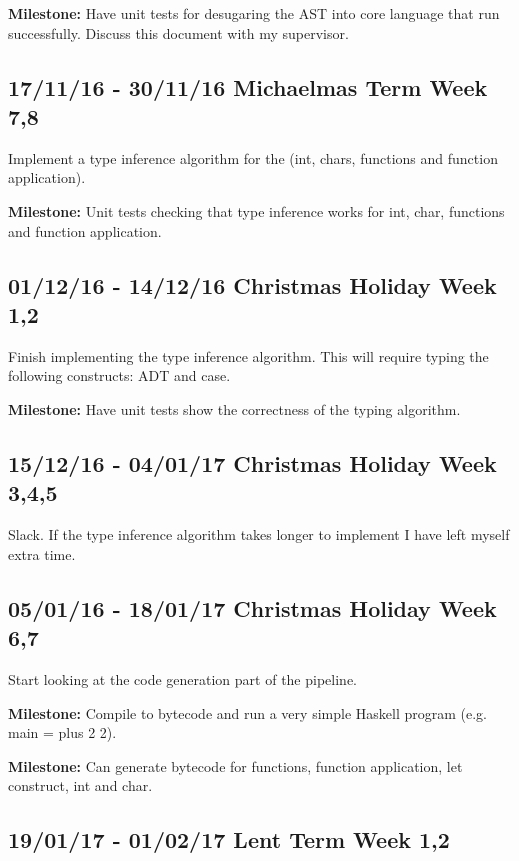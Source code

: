 \documentclass[a4paper]{article}
\begin{document}
      \textbf{Milestone:} Have unit tests for desugaring the AST into core language that run successfully. 
      Discuss this document with my supervisor.


    \subsection*{17/11/16 - 30/11/16 \hfill Michaelmas Term  Week 7,8}

      Implement a type inference algorithm for the (int, chars, functions and function application).

      \textbf{Milestone:} Unit tests checking that type inference works for int, char, functions and function application.

    \subsection*{01/12/16 - 14/12/16 \hfill Christmas Holiday Week 1,2}

    Finish implementing the type inference algorithm. This will require typing the following constructs: ADT and case.
    
    \textbf{Milestone:} Have unit tests show the correctness of the typing algorithm. 

    \subsection*{15/12/16 - 04/01/17 \hfill Christmas Holiday Week  3,4,5}

    Slack. If the type inference algorithm takes longer to implement I have left myself extra time.

    \subsection*{05/01/16 - 18/01/17 \hfill Christmas Holiday Week 6,7}

    Start looking at the code generation part of the pipeline.

    \textbf{Milestone:} Compile to bytecode and run a very simple Haskell program (e.g. main = plus 2 2).

    \textbf{Milestone:} Can generate bytecode for functions, function application, let construct, int and char.

    \subsection*{19/01/17 - 01/02/17 \hfill Lent Term Week 1,2}
\end{document}
